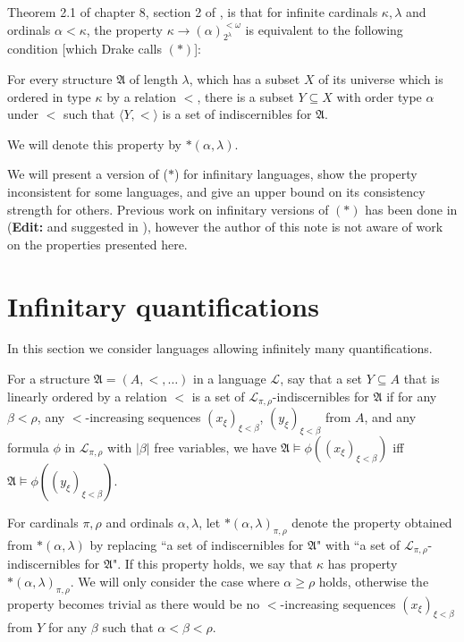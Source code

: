 \documentclass{article}
\begin{document}
Theorem 2.1 of chapter 8, section 2 of \cite{Drake74}, is that for infinite cardinals $\kappa,\lambda$ and ordinals $\alpha<\kappa$, the property $\kappa\rightarrow(\alpha)^{<\omega}_{2^\lambda}$ is equivalent to the following condition [which Drake calls $(\ast)$]:

\begin{displayquote}
For every structure $\mathfrak A$ of length $\lambda$, which has a subset $X$ of its universe which is ordered in type $\kappa$ by a relation $<$, there is a subset $Y\subseteq X$ with order type $\alpha$ under $<$ such that $\langle Y,<\rangle$ is a set of indiscernibles for $\mathfrak A$.
\end{displayquote}

We will denote this property by $\ast(\alpha,\lambda)$.

We will present a version of ($\ast$) for infinitary languages, show the property inconsistent for some languages, and give an upper bound on its consistency strength for others. Previous work on infinitary versions of $(\ast)$ has been done in \cite{Feng90} (\textbf{Edit:} and suggested in \cite{Taranovsky16}), however the author of this note is not aware of work on the properties presented here.

\section{Infinitary quantifications}

In this section we consider languages allowing infinitely many quantifications.

For a structure $\mathfrak A=(A,<,\ldots)$ in a language $\mathcal L$, say that a set $Y\subseteq A$ that is linearly ordered by a relation $<$ is a set of $\mathcal L_{\pi,\rho}$-indiscernibles for $\mathfrak A$ if for any $\beta<\rho$, any $<$-increasing sequences $(x_\xi)_{\xi<\beta}$, $(y_\xi)_{\xi<\beta}$ from $A$, and any formula $\phi$ in $\mathcal L_{\pi,\rho}$ with $\vert\beta\vert$ free variables, we have $\mathfrak A\vDash\phi((x_\xi)_{\xi<\beta})$ iff $\mathfrak A\vDash\phi((y_\xi)_{\xi<\beta})$.

For cardinals $\pi,\rho$ and ordinals $\alpha,\lambda$, let $\ast(\alpha,\lambda)_{\pi,\rho}$ denote the property obtained from $\ast(\alpha,\lambda)$ by replacing ``a set of indiscernibles for $\mathfrak A$" with ``a set of $\mathcal L_{\pi,\rho}$-indiscernibles for $\mathfrak A$". If this property holds, we say that $\kappa$ has property $\ast(\alpha,\lambda)_{\pi,\rho}$. We will only consider the case where $\alpha\geq\rho$ holds, otherwise the property becomes trivial as there would be no $<$-increasing sequences $(x_\xi)_{\xi<\beta}$ from $Y$ for any $\beta$ such that $\alpha<\beta<\rho$.
\end{document}
